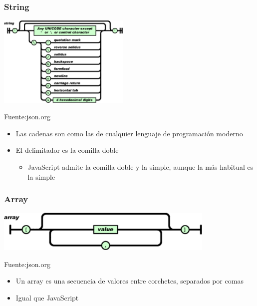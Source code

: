 \documentclass[ucs]{beamer}
\begin{document}

\begin{frame}[fragile]
\frametitle{String}
\begin{center}
  \includegraphics[width=06.3cm]{figs/string}
\end{center}
\begin{flushright}
\begin{tiny}
Fuente:json.org
\end{tiny}
\end{flushright}
\begin{itemize}
\item 
Las cadenas son como las de cualquier lenguaje de programación moderno
\item
El delimitador es la comilla doble

    \begin{itemize}
    \item
JavaScript admite la comilla doble y la simple, aunque la más habitual es la simple
    \end{itemize}
\end{itemize}
\end{frame}

\begin{frame}[fragile]
\frametitle{Array}
\begin{center}
  \includegraphics[width=10.5cm]{figs/array}
\end{center}
\begin{flushright}
\begin{tiny}
Fuente:json.org
\end{tiny}
\end{flushright}
\begin{itemize}
\item 
Un array es una secuencia de valores entre corchetes, separados por comas

\item 
Igual que JavaScript
 
\end{itemize}
\end{frame}
\end{document}
